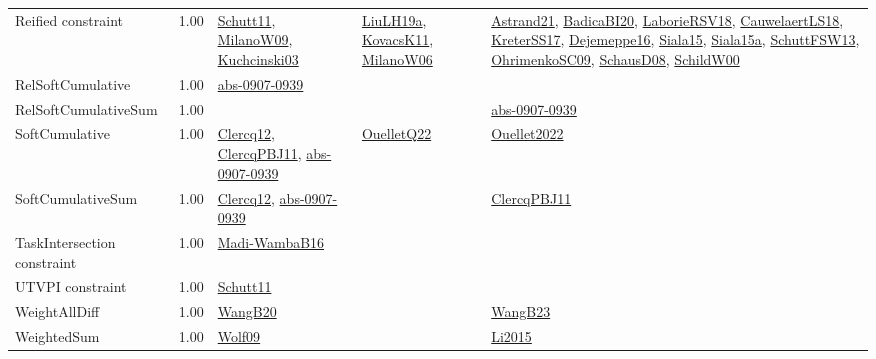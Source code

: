 {\begin{longtable}{p{3cm}r>{\raggedright\arraybackslash}p{6cm}>{\raggedright\arraybackslash}p{6cm}>{\raggedright\arraybackslash}p{8cm}}
\index{Reified constraint}\index{Constraints!Reified constraint}Reified constraint &  1.00 & \hyperref[detail:Schutt11]{Schutt11}, \hyperref[detail:MilanoW09]{MilanoW09}, \hyperref[detail:Kuchcinski03]{Kuchcinski03} & \hyperref[detail:LiuLH19a]{LiuLH19a}, \hyperref[detail:KovacsK11]{KovacsK11}, \hyperref[detail:MilanoW06]{MilanoW06} & \hyperref[detail:Astrand21]{Astrand21}, \hyperref[detail:BadicaBI20]{BadicaBI20}, \hyperref[detail:LaborieRSV18]{LaborieRSV18}, \hyperref[detail:CauwelaertLS18]{CauwelaertLS18}, \hyperref[detail:KreterSS17]{KreterSS17}, \hyperref[detail:Dejemeppe16]{Dejemeppe16}, \hyperref[detail:Siala15]{Siala15}, \hyperref[detail:Siala15a]{Siala15a}, \hyperref[detail:SchuttFSW13]{SchuttFSW13}, \hyperref[detail:OhrimenkoSC09]{OhrimenkoSC09}, \hyperref[detail:SchausD08]{SchausD08}, \hyperref[detail:SchildW00]{SchildW00}\\
\index{RelSoftCumulative}\index{Constraints!RelSoftCumulative}RelSoftCumulative &  1.00 & \hyperref[detail:abs-0907-0939]{abs-0907-0939} &  & \\
\index{RelSoftCumulativeSum}\index{Constraints!RelSoftCumulativeSum}RelSoftCumulativeSum &  1.00 &  &  & \hyperref[detail:abs-0907-0939]{abs-0907-0939}\\
\index{SoftCumulative}\index{Constraints!SoftCumulative}SoftCumulative &  1.00 & \hyperref[detail:Clercq12]{Clercq12}, \hyperref[detail:ClercqPBJ11]{ClercqPBJ11}, \hyperref[detail:abs-0907-0939]{abs-0907-0939} & \hyperref[detail:OuelletQ22]{OuelletQ22} & \hyperref[detail:Ouellet2022]{Ouellet2022}\\
\index{SoftCumulativeSum}\index{Constraints!SoftCumulativeSum}SoftCumulativeSum &  1.00 & \hyperref[detail:Clercq12]{Clercq12}, \hyperref[detail:abs-0907-0939]{abs-0907-0939} &  & \hyperref[detail:ClercqPBJ11]{ClercqPBJ11}\\
\index{TaskIntersection constraint}\index{Constraints!TaskIntersection constraint}TaskIntersection constraint &  1.00 & \hyperref[detail:Madi-WambaB16]{Madi-WambaB16} &  & \\
\index{UTVPI constraint}\index{Constraints!UTVPI constraint}UTVPI constraint &  1.00 & \hyperref[detail:Schutt11]{Schutt11} &  & \\
\index{WeightAllDiff}\index{Constraints!WeightAllDiff}WeightAllDiff &  1.00 & \hyperref[detail:WangB20]{WangB20} &  & \hyperref[detail:WangB23]{WangB23}\\
\index{WeightedSum}\index{Constraints!WeightedSum}WeightedSum &  1.00 & \hyperref[detail:Wolf09]{Wolf09} &  & \hyperref[detail:Li2015]{Li2015}\\

\end{longtable}}
